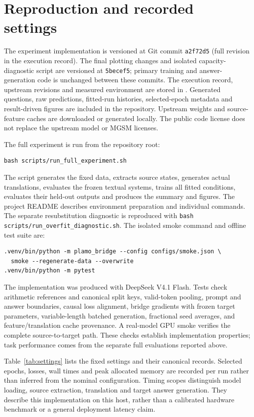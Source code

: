 \section{Reproduction and recorded settings}
\label{sec:settings}

The experiment implementation is versioned at Git commit
\texttt{a2f72d5} (full revision in the execution record).
The final plotting changes and isolated capacity-diagnostic script are versioned
at \texttt{5becef5}; primary training and
answer-generation code is unchanged between these commits.
The execution record, upstream revisions and measured environment are stored in
.
Generated questions, raw predictions, fitted-run histories, selected-epoch metadata
and result-driven figures are included in the repository.
Upstream weights and source-feature caches are downloaded or generated locally.
The public code license does not replace the upstream model or MGSM licenses.

The full experiment is run from the repository root:
\begin{verbatim}
bash scripts/run_full_experiment.sh
\end{verbatim}
The script generates the fixed data, extracts source states, generates actual
translations, evaluates the frozen textual systems, trains all fitted conditions,
evaluates their held-out outputs and produces the summary and figures.
The project README describes environment preparation and individual commands.
The separate resubstitution diagnostic is reproduced with
\texttt{bash scripts/run\_overfit\_diagnostic.sh}.
The isolated smoke command and offline test suite are:
\begin{verbatim}
.venv/bin/python -m plamo_bridge --config configs/smoke.json \
  smoke --regenerate-data --overwrite
.venv/bin/python -m pytest
\end{verbatim}

The implementation was produced with DeepSeek V4.1 Flash.
Tests check arithmetic references and canonical split keys, valid-token pooling,
prompt and answer boundaries, causal loss alignment, bridge gradients with frozen
target parameters, variable-length batched generation, fractional seed averages,
and feature/translation cache provenance.
A real-model GPU smoke verifies the complete source-to-target path.
These checks establish implementation properties; task performance comes from
the separate full evaluations reported above.

Table~\ref{tab:settings} lists the fixed settings and their canonical records.
Selected epochs, losses, wall times and peak allocated memory are recorded per
run rather than inferred from the nominal configuration.
Timing scopes distinguish model loading, source extraction, translation and target
answer generation.
They describe this implementation on this host, rather than a calibrated hardware
benchmark or a general deployment latency claim.

